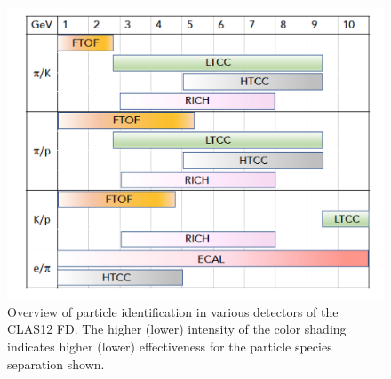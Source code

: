 \documentclass[final,3p,times,twocolumn,authoryear]{elsarticle}
\begin{document}
\begin{figure}[htbp!]
\centerline{\includegraphics[width=1.1\columnwidth]{CLAS12-pid.png}}
\caption{Overview of particle identification in various detectors of the CLAS12 FD. The higher (lower) intensity of the color shading
 indicates higher (lower) effectiveness for the particle species separation shown.  } 
\label{pid1}
\end{figure} 
\end{document}
